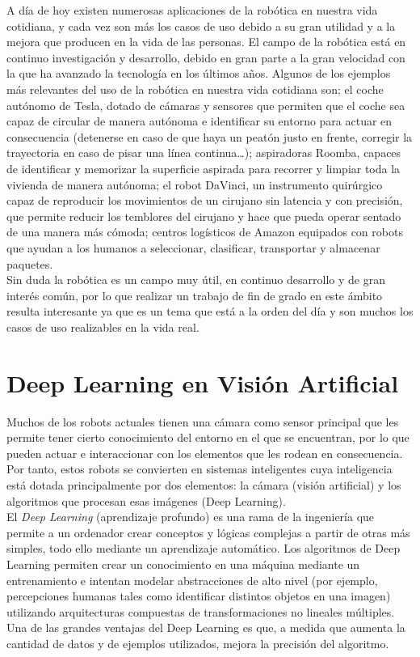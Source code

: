 \documentclass{report}
\begin{document}
A día de hoy existen numerosas aplicaciones de la robótica en nuestra vida cotidiana, y cada vez son más los casos de uso debido a su gran utilidad y a la mejora que producen en la vida de las personas. El campo de la robótica está en continuo investigación y desarrollo, debido en gran parte a la gran velocidad con la que ha avanzado la tecnología en los últimos años. Algunos de los ejemplos más relevantes del uso de la robótica en nuestra vida cotidiana son; el coche autónomo de Tesla, dotado de cámaras y sensores que permiten que el coche sea capaz de circular de manera autónoma e identificar su entorno para actuar en consecuencia (detenerse en caso de que haya un peatón justo en frente, corregir la trayectoria en caso de pisar una línea continua…);  aspiradoras Roomba, capaces de identificar y memorizar la superficie aspirada para recorrer  y limpiar toda la vivienda de manera autónoma;  el robot DaVinci, un instrumento quirúrgico capaz de reproducir los movimientos de un cirujano sin latencia y con precisión, que permite reducir los temblores del cirujano y hace que pueda operar sentado de una manera más cómoda; centros logísticos de Amazon equipados con robots que ayudan a los humanos a seleccionar, clasificar, transportar y almacenar paquetes.
\\

Sin duda la robótica es un campo muy útil, en continuo desarrollo y de gran interés común, por lo que realizar un trabajo de fin de grado en este ámbito resulta interesante ya que es un tema que está a la orden del día y son muchos los casos de uso realizables en la vida real.


\section{Deep Learning en Visión Artificial}
Muchos de los robots actuales tienen una cámara como sensor principal que les permite tener cierto conocimiento del entorno en el que se encuentran, por lo que pueden actuar e interaccionar con los elementos que les rodean en consecuencia. Por tanto, estos robots se convierten en sistemas inteligentes cuya inteligencia está dotada principalmente por dos elementos: la cámara (visión artificial) y los algoritmos que procesan esas imágenes (Deep Learning).
\\

El \textit{Deep Learning} (aprendizaje profundo) es una rama de la ingeniería que permite a un ordenador crear conceptos y lógicas complejas a partir de otras más simples, todo ello mediante un aprendizaje automático. Los algoritmos de Deep Learning permiten crear un conocimiento en una máquina mediante un entrenamiento e intentan modelar abstracciones de alto nivel (por ejemplo, percepciones humanas tales como identificar distintos objetos en una imagen) utilizando arquitecturas compuestas de transformaciones no lineales múltiples. Una de las grandes ventajas del Deep Learning es que, a medida que aumenta la cantidad de datos y de ejemplos utilizados, mejora la precisión del algoritmo. \cite{Deep Learning}
\\
\end{document}
